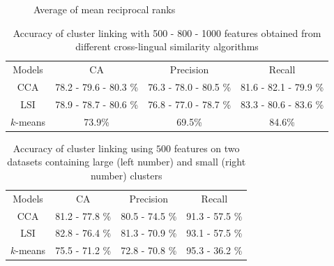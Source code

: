 \documentclass[twoside,11pt]{article}
\begin{document}
\begin{figure}
\caption{Average of mean reciprocal ranks}
\label{pic:AMRR}

\end{figure}
\begin{table}[h]
\caption{Accuracy of cluster linking with 500 - 800 - 1000 features obtained from different cross-lingual similarity algorithms}
\label{table:linkingEvalAlgos}
\begin{center}
\begin{tabular}{|c|c|c|c|}
  \hline
  \cline{1-4}
  Models & CA & Precision & Recall \\ \cline{1-4}
  CCA      & 78.2 - 79.6 - 80.3 \% & 76.3 - 78.0 - 80.5 \%  & 81.6 - 82.1 - 79.9 \%  \\ \cline{1-4}
  LSI      & 78.9 - 78.7 - 80.6 \%  & 76.8 - 77.0 - 78.7 \%  & 83.3 - 80.6 - 83.6 \%  \\ \cline{1-4}
 $k$-means & 73.9\phantom{ - 78.7 - 80.6 }\% & 69.5\phantom{ - 78.7 - 80.6 }\%  & 84.6\phantom{ - 78.7 - 80.6 }\%  \\ \cline{1-4}
\end{tabular}
\end{center}
\end{table}

\begin{table}[h]
\caption{Accuracy of cluster linking using $500$ features on two datasets containing large (left number) and small (right number) clusters}
\label{table:linkingEvalAlgosLargeSmall}
\begin{center}
\begin{tabular}{|c|c|c|c|}
  \hline
  \cline{1-4}
  Models & CA & Precision & Recall \\ \cline{1-4}
  CCA      & 81.2 - 77.8 \% & 80.5 - 74.5 \%  & 91.3 - 57.5 \%  \\ \cline{1-4}
  LSI      & 82.8 - 76.4 \% & 81.3 - 70.9 \%  & 93.1 - 57.5 \%  \\ \cline{1-4}
 $k$-means & 75.5 - 71.2 \% & 72.8 - 70.8 \%  & 95.3 - 36.2 \%  \\ \cline{1-4}
\end{tabular}
\end{center}
\end{table}
\end{document}
